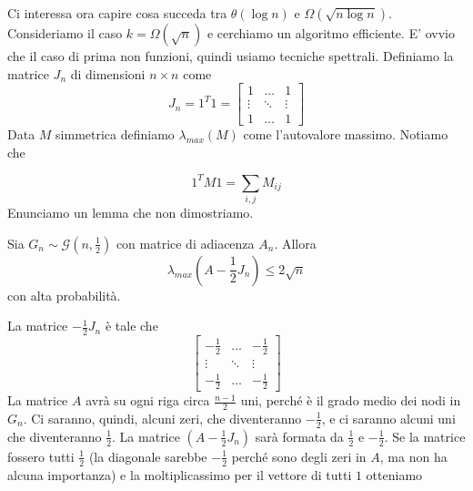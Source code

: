 \documentclass[12pt]{report}
\begin{document}

\noindent
Ci interessa ora capire cosa succeda tra $\theta(\log{n})$ e $\Omega(\sqrt{n\log{n}})$.
Consideriamo il caso $k = \Omega(\sqrt{n})$ e cerchiamo un algoritmo efficiente. E' ovvio che il caso di prima non funzioni, quindi usiamo tecniche spettrali. 
Definiamo la matrice $J_n$ di dimensioni $n \times n$ come 
\[
J_n = 1^T 1 = \begin{bmatrix}
        1 & \dots & 1\\ 
        \vdots & \ddots & \vdots \\
        1 & \dots & 1
\end{bmatrix} 
\]
Data $M$ simmetrica definiamo $\lambda_{max}(M)$ come l'autovalore massimo. Notiamo che 

$$1^T M 1 = \sum_{i,j} M_{ij}$$
Enunciamo un lemma che non dimostriamo.

\begin{lemma}
    Sia $G_n \sim \mathcal{G}(n,\frac{1}{2})$ con matrice di adiacenza $A_n$. Allora $$\lambda_{max}(A- \frac{1}{2}J_n) \leq 2 \sqrt{n} $$
    con alta probabilità.
\end{lemma}

\noindent
La matrice $- \frac{1}{2}J_n$ è tale che 
\[
\begin{bmatrix}
        -\frac{1}{2} & \dots & -\frac{1}{2}\\ 
        \vdots & \ddots & \vdots \\
        -\frac{1}{2} & \dots & -\frac{1}{2}
\end{bmatrix} 
\]
La matrice $A$ avrà su ogni riga circa $\frac{n-1}{2}$ uni, perché è il grado medio dei nodi in $G_n$. Ci saranno, quindi, alcuni zeri, che diventeranno $-\frac{1}{2}$, e ci saranno alcuni uni che diventeranno $\frac{1}{2}$. La matrice $(A- \frac{1}{2}J_n)$ sarà formata da $\frac{1}{2}$ e $-\frac{1}{2}$. Se la matrice fossero tutti $\frac{1}{2}$ (la diagonale sarebbe $-\frac{1}{2}$ perché sono degli zeri in $A$, ma non ha alcuna importanza) e la moltiplicassimo per il vettore di tutti $1$ otteniamo
\end{document}
